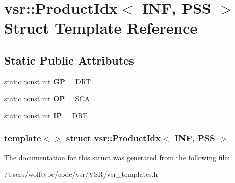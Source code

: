 \hypertarget{structvsr_1_1_product_idx_3_01_i_n_f_00_01_p_s_s_01_4}{\section{vsr\-:\-:Product\-Idx$<$ I\-N\-F, P\-S\-S $>$ Struct Template Reference}
\label{structvsr_1_1_product_idx_3_01_i_n_f_00_01_p_s_s_01_4}
}
\subsection*{Static Public Attributes}
\begin{DoxyCompactItemize}
\item 
\hypertarget{structvsr_1_1_product_idx_3_01_i_n_f_00_01_p_s_s_01_4_aba1ee1c2b05b6a573edc8265949886e1}{static const int {\bfseries G\-P} = D\-R\-T}\label{structvsr_1_1_product_idx_3_01_i_n_f_00_01_p_s_s_01_4_aba1ee1c2b05b6a573edc8265949886e1}

\item 
\hypertarget{structvsr_1_1_product_idx_3_01_i_n_f_00_01_p_s_s_01_4_a4bc323d069605c81fc17b857d06207e3}{static const int {\bfseries O\-P} = S\-C\-A}\label{structvsr_1_1_product_idx_3_01_i_n_f_00_01_p_s_s_01_4_a4bc323d069605c81fc17b857d06207e3}

\item 
\hypertarget{structvsr_1_1_product_idx_3_01_i_n_f_00_01_p_s_s_01_4_abf5d879f8f04e093109f6051cb58d55e}{static const int {\bfseries I\-P} = D\-R\-T}\label{structvsr_1_1_product_idx_3_01_i_n_f_00_01_p_s_s_01_4_abf5d879f8f04e093109f6051cb58d55e}

\end{DoxyCompactItemize}
\subsubsection*{template$<$$>$ struct vsr\-::\-Product\-Idx$<$ I\-N\-F, P\-S\-S $>$}



The documentation for this struct was generated from the following file\-:\begin{DoxyCompactItemize}
\item 
/\-Users/wolftype/code/vsr/\-V\-S\-R/vsr\-\_\-templates.\-h\end{DoxyCompactItemize}
